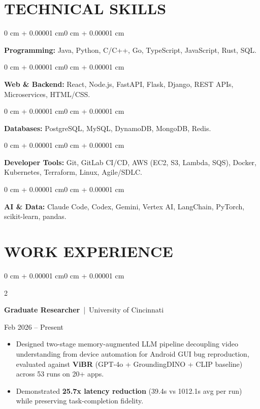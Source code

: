 \documentclass[10pt, letterpaper]{article}
\newenvironment{highlights}{
    \begin{itemize}[
        topsep=0.10 cm,
        parsep=0.06 cm,
        partopsep=0pt,
        itemsep=0.06 cm,
        leftmargin=12pt
    ]
}{
    \end{itemize}
}
\newenvironment{onecolentry}{
    \begin{adjustwidth}{0 cm + 0.00001 cm}{0 cm + 0.00001 cm}
}{
    \end{adjustwidth}
}
\newenvironment{twocolentry}[2][]{
    \onecolentry
    \def\secondColumn{#2}
    \setcolumnwidth{\fill, 4.5 cm}
    \begin{paracol}{2}
}{
    \switchcolumn \raggedleft \secondColumn
    \end{paracol}
    \endonecolentry
}
\begin{document}
\section{TECHNICAL SKILLS}
\begin{onecolentry}
\textbf{Programming:} Java, Python, C/C++, Go, TypeScript, JavaScript, Rust, SQL.
\end{onecolentry}
\vspace{0.06 cm}
\begin{onecolentry}
\textbf{Web \& Backend:} React, Node.js, FastAPI, Flask, Django, REST APIs, Microservices, HTML/CSS.
\end{onecolentry}
\vspace{0.06 cm}
\begin{onecolentry}
\textbf{Databases:} PostgreSQL, MySQL, DynamoDB, MongoDB, Redis.
\end{onecolentry}
\vspace{0.06 cm}
\begin{onecolentry}
\textbf{Developer Tools:} Git, GitLab CI/CD, AWS (EC2, S3, Lambda, SQS), Docker, Kubernetes, Terraform, Linux, Agile/SDLC.
\end{onecolentry}
\vspace{0.06 cm}
\begin{onecolentry}
\textbf{AI \& Data:} Claude Code, Codex, Gemini, Vertex AI, LangChain, PyTorch, scikit-learn, pandas.
\end{onecolentry}

\section{WORK EXPERIENCE}
\begin{twocolentry}{Feb 2026 -- Present}
\textbf{Graduate Researcher} \,|\, University of Cincinnati
\end{twocolentry}
\begin{highlights}
  \item Designed two-stage memory-augmented LLM pipeline decoupling video understanding from device automation for Android GUI bug reproduction, evaluated against \textbf{ViBR} (GPT-4o + GroundingDINO + CLIP baseline) across 53 runs on 20+ apps.
  \item Demonstrated \textbf{25.7x latency reduction} (39.4s vs 1012.1s avg per run) while preserving task-completion fidelity.
\end{highlights}
\end{document}
